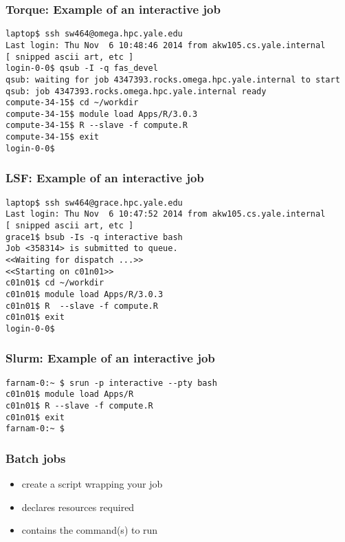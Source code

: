 \documentclass[10pt]{beamer}
\begin{document}
\begin{frame}[fragile]
\frametitle{Torque: Example of an interactive job}
\begin{verbatim}
laptop$ ssh sw464@omega.hpc.yale.edu
Last login: Thu Nov  6 10:48:46 2014 from akw105.cs.yale.internal
[ snipped ascii art, etc ]
login-0-0$ qsub -I -q fas_devel
qsub: waiting for job 4347393.rocks.omega.hpc.yale.internal to start
qsub: job 4347393.rocks.omega.hpc.yale.internal ready
compute-34-15$ cd ~/workdir
compute-34-15$ module load Apps/R/3.0.3
compute-34-15$ R --slave -f compute.R
compute-34-15$ exit 
login-0-0$ 
\end{verbatim}
\end{frame}

\begin{frame}[fragile]
\frametitle{LSF: Example of an interactive job}
\begin{verbatim}
laptop$ ssh sw464@grace.hpc.yale.edu
Last login: Thu Nov  6 10:47:52 2014 from akw105.cs.yale.internal
[ snipped ascii art, etc ]
grace1$ bsub -Is -q interactive bash
Job <358314> is submitted to queue.
<<Waiting for dispatch ...>>
<<Starting on c01n01>>
c01n01$ cd ~/workdir
c01n01$ module load Apps/R/3.0.3
c01n01$ R  --slave -f compute.R
c01n01$ exit 
login-0-0$ 
\end{verbatim}
\end{frame}

\begin{frame}[fragile]
\frametitle{Slurm: Example of an interactive job}
\begin{verbatim}
farnam-0:~ $ srun -p interactive --pty bash
c01n01$ module load Apps/R
c01n01$ R --slave -f compute.R
c01n01$ exit
farnam-0:~ $
\end{verbatim}
\end{frame}

\begin{frame}[fragile]
\frametitle{Batch jobs}
\begin{itemize}
\item create a script wrapping your job
\item declares resources required
\item contains the command(s) to run
\end{itemize}

\end{frame}
\end{document}
